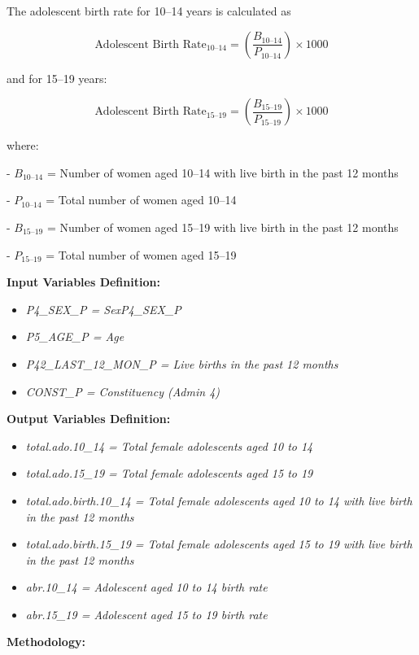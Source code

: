 \documentclass[
]{article}
\begin{document}
The adolescent birth rate for 10--14 years is calculated as

\[
\text{Adolescent Birth Rate}_{10\text{--}14} = \left( \frac{B_{10\text{--}14}}{P_{10\text{--}14}} \right) \times 1000
\]

and for 15--19 years:

\[
\text{Adolescent Birth Rate}_{15\text{--}19} = \left( \frac{B_{15\text{--}19}}{P_{15\text{--}19}} \right) \times 1000
\]

where:

- \(B_{10\text{--}14}\) = Number of women aged 10--14 with live birth in
the past 12 months

- \(P_{10\text{--}14}\) = Total number of women aged 10--14

- \(B_{15\text{--}19}\) = Number of women aged 15--19 with live birth in
the past 12 months

- \(P_{15\text{--}19}\) = Total number of women aged 15--19

\textbf{Input Variables Definition:}

\begin{itemize}
\item
  \emph{P4\_SEX\_P = SexP4\_SEX\_P}
\item
  \emph{P5\_AGE\_P = Age}
\item
  \emph{P42\_LAST\_12\_MON\_P = Live births in the past 12 months}
\item
  \emph{CONST\_P = Constituency (Admin 4)}
\end{itemize}

\textbf{Output Variables Definition:}

\begin{itemize}
\item
  \emph{total.ado.10\_14 = Total female adolescents aged 10 to 14}
\item
  \emph{total.ado.15\_19 = Total female adolescents aged 15 to 19}
\item
  \emph{total.ado.birth.10\_14 = Total female adolescents aged 10 to 14
  with live birth in the past 12 months}
\item
  \emph{total.ado.birth.15\_19 = Total female adolescents aged 15 to 19
  with live birth in the past 12 months}
\item
  \emph{abr.10\_14 = Adolescent aged 10 to 14 birth rate}
\item
  \emph{abr.15\_19 = Adolescent aged 15 to 19 birth rate}
\end{itemize}

\textbf{Methodology:}
\end{document}
